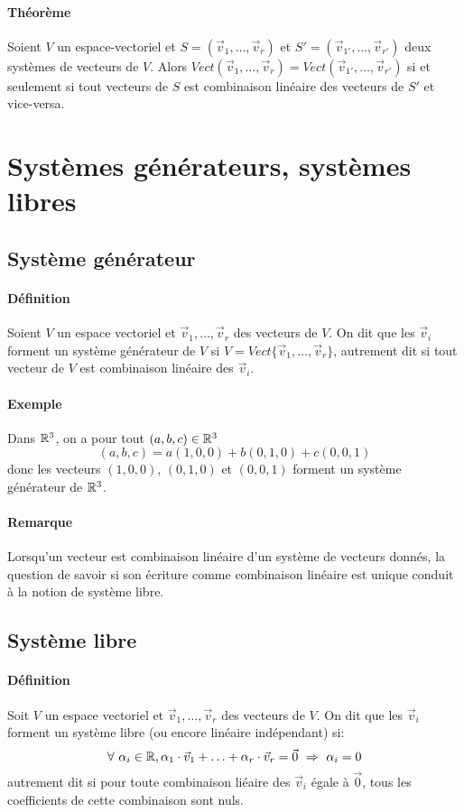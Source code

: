 \paragraph{Théorème} Soient $V$ un espace-vectoriel et $S = (\vec{v}_1, \ldots, \vec{v}_r)$ et $S' = (\vec{v}_{1'}, \ldots, \vec{v}_{r'})$ deux systèmes de vecteurs de $V$. Alors $Vect(\vec{v}_1, \ldots, \vec{v}_r) = Vect(\vec{v}_{1'}, \ldots, \vec{v}_{r'})$ si et seulement si tout vecteurs de $S$ est combinaison linéaire des vecteurs de $S'$ et vice-versa.

%
%
\section{Systèmes générateurs, systèmes libres}
%
%


%
\subsection{Système générateur}
%
\paragraph{Définition} Soient $V$ un espace vectoriel et $\vec{v}_1, \ldots, \vec{v}_r$ des vecteurs de $V$. On dit que les $\vec{v}_i$ forment un système générateur de $V$ si $V = Vect\{\vec{v}_1, \ldots, \vec{v}_r\}$, autrement dit si tout vecteur de $V$ est combinaison linéaire des $\vec{v}_i$.

\paragraph{Exemple} Dans $\mathbb{R}^3$, on a pour tout $(a,b,c) \in \mathbb{R}^3$ $$(a, b, c)=a(1,0,0)+b(0,1,0)+c(0,0,1)$$ donc les vecteurs $(1,0,0)$, $(0,1,0)$ et $(0,0,1)$ forment un système générateur de $\mathbb{R}^3$.

\paragraph{Remarque} Lorsqu'un vecteur est combinaison linéaire d'un système de vecteurs donnés, la question de savoir si son écriture comme combinaison linéaire est unique conduit à la notion de système libre.


%
\subsection{Système libre}
%
\paragraph{Définition} Soit $V$ un espace vectoriel et $\vec{v}_1, \ldots , \vec{v}_r$ des vecteurs de $V$. On dit que les $\vec{v}_i$ forment un système libre (ou encore linéaire indépendant) si:
$$\forall ~ \alpha_i \in \mathbb{R}, \alpha_1 \cdot \vec{v}_1 + \ldots + \alpha_r \cdot \vec{v}_r = \vec{0} ~ \Rightarrow ~ \alpha_i = 0$$
autrement dit si pour toute combinaison liéaire des $\vec{v}_i$ égale à $\vec{0}$, tous les coefficients de cette combinaison sont nuls.
